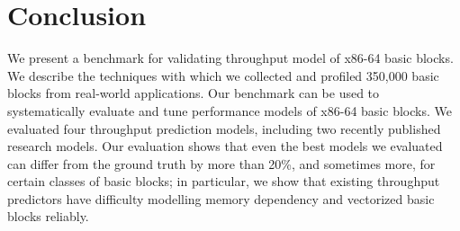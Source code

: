 \section{Conclusion}
We present a benchmark for validating throughput model of x86-64 basic blocks.
We describe the techniques with which we collected
and profiled 350,000 basic blocks from real-world applications.
Our benchmark can be used to systematically evaluate and tune performance models
of x86-64 basic blocks.
We evaluated four throughput prediction models, including two recently
published research models.
Our evaluation shows that even the best models we evaluated can differ from
the ground truth by more than 20\%, and sometimes more, 
for certain classes of basic blocks;
in particular, we show that existing throughput predictors have difficulty 
modelling memory dependency and vectorized basic blocks reliably.